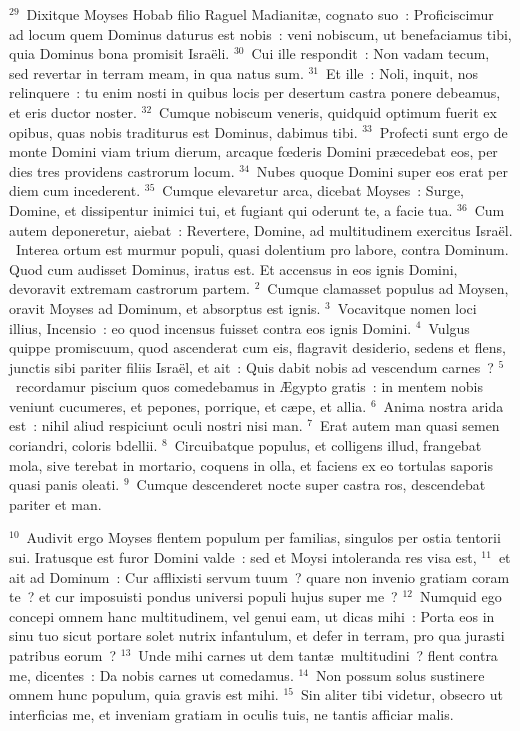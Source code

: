 ${}^{29}$~Dixitque Moyses Hobab filio Raguel Madianit\ae , cognato suo~: Proficiscimur ad locum quem Dominus daturus est nobis~: veni nobiscum, ut benefaciamus tibi, quia Dominus bona promisit Isra\"eli.
${}^{30}$~Cui ille respondit~: Non vadam tecum, sed revertar in terram meam, in qua natus sum.
${}^{31}$~Et ille~: Noli, inquit, nos relinquere~: tu enim nosti in quibus locis per desertum castra ponere debeamus, et eris ductor noster.
${}^{32}$~Cumque nobiscum veneris, quidquid optimum fuerit ex opibus, quas nobis traditurus est Dominus, dabimus tibi.
${}^{33}$~Profecti sunt ergo de monte Domini viam trium dierum, arcaque fœderis Domini pr\ae cedebat eos, per dies tres providens castrorum locum.
${}^{34}$~Nubes quoque Domini super eos erat per diem cum incederent.
${}^{35}$~Cumque elevaretur arca, dicebat Moyses~: Surge, Domine, et dissipentur inimici tui, et fugiant qui oderunt te, a facie tua.
${}^{36}$~Cum autem deponeretur, aiebat~: Revertere, Domine, ad multitudinem exercitus Isra\"el.
~Interea ortum est murmur populi, quasi dolentium pro labore, contra Dominum. Quod cum audisset Dominus, iratus est. Et accensus in eos ignis Domini, devoravit extremam castrorum partem.
${}^{2}$~Cumque clamasset populus ad Moysen, oravit Moyses ad Dominum, et absorptus est ignis.
${}^{3}$~Vocavitque nomen loci illius, Incensio~: eo quod incensus fuisset contra eos ignis Domini.
${}^{4}$~Vulgus quippe promiscuum, quod ascenderat cum eis, flagravit desiderio, sedens et flens, junctis sibi pariter filiis Isra\"el, et ait~: Quis dabit nobis ad vescendum carnes~?
${}^{5}$~recordamur piscium quos comedebamus in \AE gypto gratis~: in mentem nobis veniunt cucumeres, et pepones, porrique, et c\ae pe, et allia.
${}^{6}$~Anima nostra arida est~: nihil aliud respiciunt oculi nostri nisi man.
${}^{7}$~Erat autem man quasi semen coriandri, coloris bdellii.
${}^{8}$~Circuibatque populus, et colligens illud, frangebat mola, sive terebat in mortario, coquens in olla, et faciens ex eo tortulas saporis quasi panis oleati.
${}^{9}$~Cumque descenderet nocte super castra ros, descendebat pariter et man.


${}^{10}$~Audivit ergo Moyses flentem populum per familias, singulos per ostia tentorii sui. Iratusque est furor Domini valde~: sed et Moysi intoleranda res visa est,
${}^{11}$~et ait ad Dominum~: Cur afflixisti servum tuum~? quare non invenio gratiam coram te~? et cur imposuisti pondus universi populi hujus super me~?
${}^{12}$~Numquid ego concepi omnem hanc multitudinem, vel genui eam, ut dicas mihi~: Porta eos in sinu tuo sicut portare solet nutrix infantulum, et defer in terram, pro qua jurasti patribus eorum~?
${}^{13}$~Unde mihi carnes ut dem tant\ae\ multitudini~? flent contra me, dicentes~: Da nobis carnes ut comedamus.
${}^{14}$~Non possum solus sustinere omnem hunc populum, quia gravis est mihi.
${}^{15}$~Sin aliter tibi videtur, obsecro ut interficias me, et inveniam gratiam in oculis tuis, ne tantis afficiar malis.


